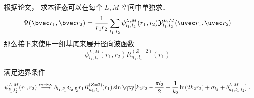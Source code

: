 
根据论文， 求本征态可以在每个 $L,M$ 空间中单独求．
\begin{equation}
\Psi(\bvec r_1, \bvec r_2) = \frac{1}{r_1 r_2}\sum_{l_1, l_2}  \psi_{l_1, l_2}^{L, M}(r_1, r_2)\mathcal{Y}_{l_1, l_2}^{L, M}(\uvec r_1, \uvec r_2)
\end{equation}
那么接下来使用一组基底来展开径向波函数
\begin{equation}
\psi_{l_1, l_2}^{L, M}(r_1, r_2) R_{n_1,l_1}^{(Z=2)}(r_1)
\end{equation}

满足边界条件
\begin{equation}
\psi_{l'_1,l'_2}^{L, M}(r_1, r_2) \overset{r_2\to\infty}{\longrightarrow} \delta_{l_1,l'_1}\delta_{l_2,l'_2} r_1 R_{n_1,l_1}^{(Z=2)}(r_1)
\sin\qty[k_2 r_2 - \frac{\pi l_2}{2} +\frac{1}{k_2}\ln(2k_2 r_2) + \sigma_{l_2} + \delta_{n_1,l_1,l_2}^{L,M}]~.
\end{equation}
